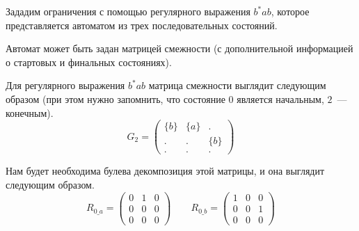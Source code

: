 Зададим ограничения с помощью регулярного выражения $b^*ab$, которое представляется автоматом из трех последовательных состояний.
\begin{center}
\end{center}

Автомат может быть задан матрицей смежности (с дополнительной информацией о стартовых и финальных состояниях).

Для регулярного выражения $b^*ab$ матрица смежности выглядит следующим образом (при этом нужно запомнить, что состояние $0$ является начальным, $2$~--- конечным).
\[
    G_2 =
    \begin{pmatrix}
        \{b\} & \{a\} & .     \\
        .     & .     & \{b\} \\
        .     & .     & .
    \end{pmatrix}
\]

Нам будет необходима булева декомпозиция этой матрицы, и она выглядит следующим образом.
\[
    R_{0\_a} = \begin{pmatrix}
        0 & 1 & 0 \\
        0 & 0 & 0 \\
        0 & 0 & 0
    \end{pmatrix} \qquad
    R_{0\_b} = \begin{pmatrix}
        1 & 0 & 0 \\
        0 & 0 & 1 \\
        0 & 0 & 0
    \end{pmatrix}
\]

